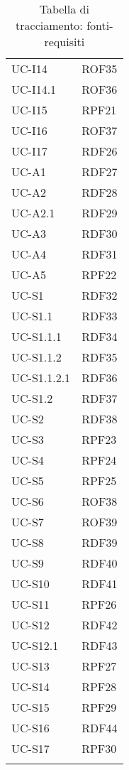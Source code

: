 \begin{longtable}{| p{5cm} | p{5cm} |}
		\rowcolor{LightGray}
		UC-I14 & ROF35 \\
		UC-I14.1 & ROF36 \\
		\rowcolor{LightGray}
		UC-I15 & RPF21 \\
		UC-I16 & ROF37 \\
		\rowcolor{LightGray}
		UC-I17 & RDF26\\		
		UC-A1 & RDF27\\
		\rowcolor{LightGray}
		UC-A2 & RDF28 \\
		UC-A2.1 & RDF29 \\
		\rowcolor{LightGray}
		UC-A3 & RDF30\\
		UC-A4 & RDF31 \\
		\rowcolor{LightGray}
		UC-A5 & RPF22\\
		UC-S1 & RDF32 \\
		\rowcolor{LightGray}
		UC-S1.1 & RDF33\\
		UC-S1.1.1 & RDF34\\
		\rowcolor{LightGray}
		UC-S1.1.2 & RDF35\\
		UC-S1.1.2.1 & RDF36\\
		\rowcolor{LightGray}
		UC-S1.2 & RDF37\\
		UC-S2 & RDF38\\
		\rowcolor{LightGray}
		UC-S3 & RPF23\\
		UC-S4 & RPF24\\
		\rowcolor{LightGray}
		UC-S5 & RPF25 \\
		UC-S6 & ROF38 \\
		\rowcolor{LightGray}
		UC-S7 & ROF39 \\
		UC-S8 & RDF39 \\
		\rowcolor{LightGray}
		UC-S9 & RDF40 \\
		UC-S10 & RDF41\\
		\rowcolor{LightGray}
		UC-S11 & RPF26 \\
		UC-S12 & RDF42 \\
		\rowcolor{LightGray}
		UC-S12.1 & RDF43 \\
		UC-S13 & RPF27 \\
		\rowcolor{LightGray}
		UC-S14 & RPF28 \\
		UC-S15 & RPF29 \\
		\rowcolor{LightGray} 
		UC-S16 & RDF44\\
		UC-S17 & RPF30\\
		\rowcolor{LightGray}		
		\hline
		\caption{Tabella di tracciamento: fonti-requisiti}
\end{longtable}
\newpage
